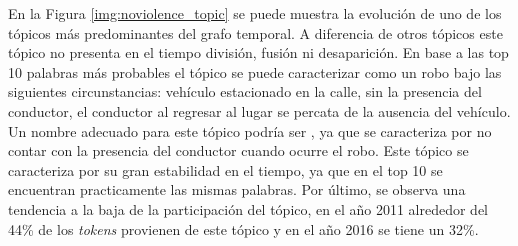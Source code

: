 En la Figura \ref{img:noviolence_topic} se puede muestra la evolución de uno de los tópicos más predominantes del grafo temporal. A diferencia de otros tópicos este tópico no presenta en el tiempo división, fusión ni desaparición. En base a las top 10 palabras más probables el tópico se puede caracterizar como un robo bajo las siguientes circunstancias: vehículo estacionado en la calle, sin la presencia del conductor, el conductor al regresar al lugar se percata de la ausencia del vehículo. Un nombre adecuado para este tópico podría ser , ya que se caracteriza por no contar con la presencia del conductor cuando ocurre el robo. Este tópico se caracteriza por su gran estabilidad en el tiempo, ya que en el top 10 se encuentran practicamente las mismas palabras. Por último, se observa una tendencia a la baja de la participación del tópico, en el año 2011 alrededor del 44\% de los \textit{tokens} provienen de este tópico y en el año 2016 se tiene un 32\%.


\def\topic[#1,#2,#3,#4,#5,#6]#7{
        \node[fill=#1, rounded corners, minimum height=#2, minimum width=#3, text width=4em] (#5) at #6 {}; 
        \node[anchor=#4,inner sep=2pt,] at (#5.#4)  {#7};
}
\def\tedge[#1,#2,#3,#4,#5];{ 
  \definecolor{color0}{RGB}{153,153,153}
  \draw[color=color0,#4,fill=white, line width=4*#5pt] (#1) -- #3
  (#2);  
}


